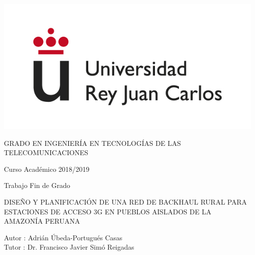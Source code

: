 \documentclass[a4paper, 12pt]{report}
\begin{document}
	\pagestyle{empty}
	\begin{titlepage}
		\centering
		\includegraphics[scale=0.5]{img/logo_urjc.jpg}
		\vspace{3cm}
		
		\Large
		GRADO EN INGENIERÍA EN TECNOLOGÍAS DE LAS TELECOMUNICACIONES
		
		\vspace{0.4cm}
		
		\large
		Curso Académico 2018/2019
		
		\vspace{0.8cm}
		
		Trabajo Fin de Grado
		
		\vspace{2.5cm}		
		\LARGE		
		DISEÑO Y PLANIFICACIÓN DE UNA RED DE
		BACKHAUL RURAL PARA ESTACIONES DE
		ACCESO 3G EN PUEBLOS AISLADOS DE LA
		AMAZONÍA PERUANA
		
		\vspace{2.5 cm}
		
		\large
		Autor : Adrián Úbeda-Portugués Casas \\
		Tutor : Dr. Francisco Javier Simó Reigadas
		\afterpage{\null\newpage}
		\pagestyle{empty}
	\end{titlepage}
	
	
	
	
	
	\thispagestyle{empty}
	\tableofcontents
	\afterpage{\null\newpage}
	\pagestyle{empty}
	\thispagestyle{empty}
	\setcounter{page}{1}
	\pagestyle{plain}
	
	
	
	
	
	
	
	
	
	
	
\end{document}
